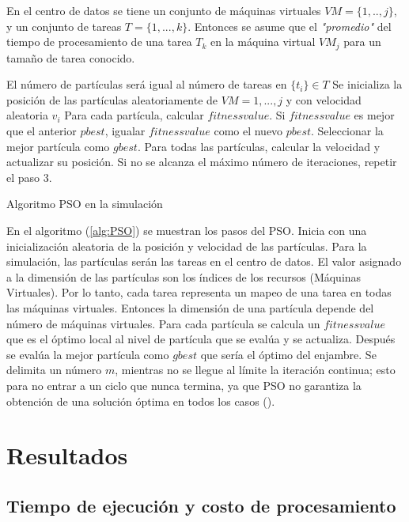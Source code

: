 \documentclass[jou,apacite]{apa6}
\begin{document}
En el centro de datos se tiene un conjunto de máquinas virtuales $VM = \{1,..,j\}$, y un conjunto de tareas $T = \{1,...,k\}$. Entonces se asume que el \textit{"promedio"} del tiempo de procesamiento de una tarea $T_k$ en la máquina virtual $VM_j$ para un tamaño de tarea conocido.
\newpage
\begin{algorithm} 
	\begin{algorithmic}[1]
		\State El número de partículas será igual al número de tareas en $ \{ t_i \} \in T $
		\State Se inicializa la posición de las partículas aleatoriamente de $VM = 1,...,j $ y con velocidad aleatoria $v_i$
		\State Para cada partícula, calcular $fitness value$.
		\State Si $fitness value$ es mejor que el anterior $pbest$, igualar $fitness value$ como el nuevo $pbest$.
		\State Seleccionar la mejor partícula como $gbest$.
		\State Para todas las partículas, calcular la velocidad y actualizar su posición.
		\State Si no se alcanza el máximo número de iteraciones, repetir el paso 3.
		
	\end{algorithmic} 
	\caption{Algoritmo PSO en la simulación}
	\label{alg:PSO}
\end{algorithm}

En el algoritmo (\ref{alg:PSO}) se muestran los pasos del PSO. Inicia con una inicialización aleatoria de la posición y velocidad de las partículas. Para la simulación, las partículas serán las tareas en el centro de datos.
El valor asignado a la dimensión de las partículas son los índices de los recursos (Máquinas Virtuales). Por lo tanto, cada tarea representa un mapeo de una tarea en todas las máquinas virtuales. Entonces la dimensión de una partícula depende del número de máquinas virtuales.
Para cada partícula se calcula un $fitnessvalue$ que es el óptimo local al nivel de partícula que se evalúa y se actualiza. 
Después se evalúa la mejor partícula como $gbest$ que sería el óptimo del enjambre.
Se delimita un número $m$, mientras no se llegue al límite la iteración continua; esto para no entrar a un ciclo que nunca termina, ya que PSO  no garantiza la obtención de una solución óptima en todos los casos (\cite{osman2012}).

\section{Resultados}

\subsection{Tiempo de ejecuci\'on y costo de procesamiento}
\end{document}
